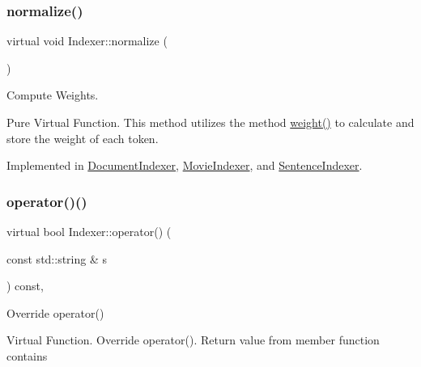 \mbox{\label{class_indexer_a84f50c7bac96cd5a8daa18899a39bb5d}} 
\subsubsection{\texorpdfstring{normalize()}{normalize()}}
{\footnotesize\ttfamily virtual void Indexer\+::normalize (\begin{DoxyParamCaption}{ }\end{DoxyParamCaption})\hspace{0.3cm}{\ttfamily [pure virtual]}}



Compute Weights. 

Pure Virtual Function. This method utilizes the method \hyperlink{class_indexer_a8301fcbdf40afd926ab71d4767575d32}{weight()} to calculate and store the weight of each token. 

Implemented in \hyperlink{class_document_indexer_a5e0aeb92576847e9462670693cb0737c}{Document\+Indexer}, \hyperlink{class_movie_indexer_a87d8a0a6c117e3cbc9f5872889b9ed6d}{Movie\+Indexer}, and \hyperlink{class_sentence_indexer_ae038d36081439a5107821ac48a318d66}{Sentence\+Indexer}.

\mbox{\label{class_indexer_aa2be6d79e0425aafd10b98118fcbb4ee}} 
\subsubsection{\texorpdfstring{operator()()}{operator()()}}
{\footnotesize\ttfamily virtual bool Indexer\+::operator() (\begin{DoxyParamCaption}\item[{const std\+::string \&}]{s }\end{DoxyParamCaption}) const\hspace{0.3cm}{\ttfamily [inline]}, {\ttfamily [virtual]}}



Override operator() 

Virtual Function. Override operator(). Return value from member function contains \mbox{\label{class_indexer_a8d98ba740db6f5f8521d557bf908aead}} 
